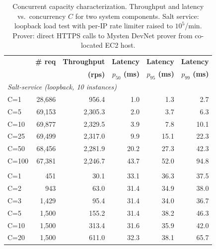 \begin{table}[t]
  \centering
  \caption{Concurrent capacity characterization. Throughput and latency vs.\
    concurrency $C$ for two system components. Salt service: loopback load test
    with per-IP rate limiter raised to $10^5$/min. Prover: direct HTTPS calls
    to Mysten DevNet prover from co-located EC2 host.}
  \label{tab:concurrent}
  \footnotesize
  \begin{tabular}{l rrrrr}
    \toprule
     & \textbf{\# req} & \textbf{Throughput} & \textbf{Latency} & \textbf{Latency} & \textbf{Latency} \\
     & & \textbf{(rps)} & \textbf{$p_{50}$ (ms)} & \textbf{$p_{95}$ (ms)} & \textbf{$p_{99}$ (ms)} \\
    \midrule
  \multicolumn{6}{l}{\textit{Salt-service (loopback, 10 instances)}} \\
    C=1 & 28,686 & 956.4 & 1.0 & 1.3 & 2.7 \\
    C=5 & 69,153 & 2,305.3 & 2.0 & 3.7 & 6.3 \\
    C=10 & 69,877 & 2,329.5 & 3.9 & 7.8 & 10.1 \\
    C=25 & 69,499 & 2,317.0 & 9.9 & 15.1 & 22.3 \\
    C=50 & 68,456 & 2,281.9 & 20.2 & 27.3 & 42.3 \\
    C=100 & 67,381 & 2,246.7 & 43.7 & 52.0 & 94.8 \\
  \addlinespace
  \multicolumn{6}{l}{\textit{Mysten ZK prover (HTTPS, us-east-1 $\leftrightarrow$ us-east-1)}} \\
    C=1 & 451 & 30.1 & 33.1 & 36.3 & 37.5 \\
    C=2 & 943 & 63.0 & 31.4 & 34.9 & 38.0 \\
    C=3 & 1,429 & 95.4 & 31.4 & 34.0 & 36.7 \\
    C=5 & 1,500 & 155.2 & 31.4 & 38.2 & 46.3 \\
    C=10 & 1,500 & 313.4 & 31.6 & 35.9 & 42.0 \\
    C=20 & 1,500 & 611.0 & 32.3 & 38.1 & 65.7 \\
    \bottomrule
  \end{tabular}
\end{table}
